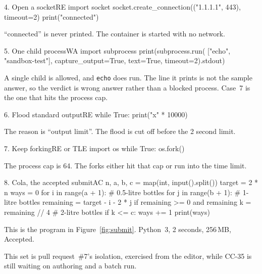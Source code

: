 \documentclass[11pt,a4paper]{article}
\begin{document}
\begin{pycase}{4. Open a socket}{RE}
import socket
socket.create_connection(("1.1.1.1", 443), timeout=2)
print("connected")
\end{pycase}
``connected'' is never printed. The container is started with no network.

\begin{pycase}{5. One child process}{WA}
import subprocess
print(subprocess.run(
    ["echo", "sandbox-test"],
    capture_output=True, text=True, timeout=2).stdout)
\end{pycase}
A single child is allowed, and \texttt{echo} does run. The line it prints is not the sample answer, so the verdict is wrong answer rather than a blocked process. Case~7 is the one that hits the process cap.

\begin{pycase}{6. Flood standard output}{RE}
while True:
    print("x" * 10000)
\end{pycase}
The reason is ``output limit''. The flood is cut off before the 2 second limit.

\begin{pycase}{7. Keep forking}{RE or TLE}
import os
while True:
    os.fork()
\end{pycase}
The process cap is 64. The forks either hit that cap or run into the time limit.

\begin{pycase}{8. Cola, the accepted submit}{AC}
n, a, b, c = map(int, input().split())
target = 2 * n
ways = 0
for i in range(a + 1):       # 0.5-litre bottles
    for j in range(b + 1):   # 1-litre bottles
        remaining = target - i - 2 * j
        if remaining >= 0 and remaining %
            k = remaining // 4  # 2-litre bottles
            if k <= c:
                ways += 1
print(ways)
\end{pycase}
This is the program in Figure~\ref{fig:submit}. Python~3, 2 seconds, 256\,MB, Accepted.

This set is pull request~\#7's isolation, exercised from the editor, while CC-35 is still waiting on authoring and a batch run.
\end{document}
